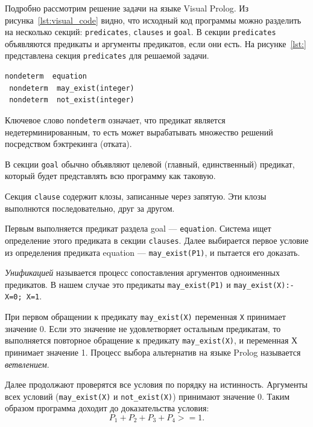 \newpage

Подробно рассмотрим решение задачи на языке Visual Prolog. Из рисунка~\ref{lst:visual_code} видно,
что исходный код программы можно разделить на несколько секций: \texttt{predicates},
\texttt{clauses} и \texttt{goal}. В секции \texttt{predicates} объявляются предикаты
и аргументы предикатов, если они есть. На рисунке~\ref{lst:} представлена секция \texttt{predicates}
для решаемой задачи.
\begin{lstlisting}[style=source_code,caption=Секция \texttt{predicates} для решаемой задачи,label=lst:predicates]
 nondeterm  equation
 nondeterm  may_exist(integer)
 nondeterm  not_exist(integer)
\end{lstlisting}

Ключевое слово \texttt{nondeterm} означает, что предикат является недетерминированным, то есть
может вырабатывать множество решений посредством бэктрекинга (отката). 

В секции \texttt{goal} обычно объявляют целевой (главный, единственный) предикат, который будет
представлять всю программу как таковую. 

Секция \texttt{clause} содержит клозы, записанные через запятую. Эти клозы выполнются
последовательно, друг за другом. 

Первым выполняется предикат раздела goal --- \texttt{equation}. Система ищет определение
этого предиката в секции \texttt{clauses}. Далее выбирается первое условие из
определения предиката equation --- \texttt{may\_exist(P1)}, и пытается его доказать.  

\textit{Унификацией} называется процесс сопоставления аргументов одноименных предикатов.
В нашем случае это предикаты \texttt{may\_exist(P1)} и \texttt{may\_exist(X):-X=0; X=1}.

При первом обращении к предикату \texttt{may\_exist(X)} переменная \texttt{X} принимает
значение 0. Если это значение не удовлетворяет остальным предикатам, то
выполняется повторное обращение к предикату \texttt{may\_exist(X)}, и переменная Х
принимает значение 1. Процесс выбора альтернатив на языке Prolog называется
\textit{ветвлением}.

Далее продолжают проверятся все условия по порядку на истинность.
Аргументы всех условий (\texttt{may\_exist(X)} и \texttt{not\_exist(X)})
принимают значение 0. Таким образом программа доходит до доказательства условия:
\begin{equation}
 \label{eq:eq}
 P_1+P_2+P_3+P_4 >= 1.
\end{equation}

